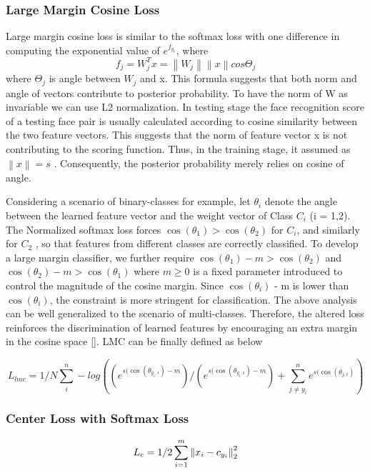 \documentclass[a4paper,12pt, twoside]{NITKReport}
\begin{document}
\subsubsection{Large Margin Cosine Loss}
Large margin cosine loss is similar to the softmax loss with one difference in computing the exponential value of $e^{f_{y_{i}}}$, where 
\begin{equation}
{f_{j}}=W_{j}^{T} x = \left \| W_{j} \right \|\left \| x \right \|cos\Theta _{j}
\end{equation}
where $\Theta _{j}$ is angle between $W_{j}$ and x. This formula suggests that both norm and angle of vectors contribute to posterior probability. To have the norm of W as invariable we can use L2 normalization. In testing stage the face recognition score of a testing face pair is usually calculated according to cosine similarity between the two feature vectors.  This suggests that the norm of feature vector x is not  contributing to the scoring function.  Thus, in the training stage, it assumed as $\left \| x \right \| =s$ . Consequently, the posterior probability merely relies on cosine of angle.

Considering  a  scenario  of  binary-classes  for  example, let $\theta _{i}$ denote the angle between the learned feature vector and  the  weight  vector  of  Class $C_{i}$ (i = 1,2). The Normalized softmax loss forces $\cos(\theta_{1}) > \cos(\theta_{2})$ for $C_{i}$, and similarly  for $C_{2}$ , so that features from different classes are correctly classified. To develop a large margin classifier, we further require $\cos(\theta_{1}) - m > \cos(\theta_{2})$ and $\cos(\theta_{2}) - m > \cos(\theta_{1})$ where $m \geq 0$  is a fixed parameter introduced to control the magnitude of the cosine margin. Since $\cos(\theta_{i})$ - m is lower than $\cos(\theta_{i})$, the constraint is more stringent for classification. The above analysis can be well generalized to the scenario of multi-classes.  Therefore, the altered loss reinforces the
discrimination of learned features by encouraging an extra margin in the cosine space [\cite{DBLP:journals/corr/abs-1801-09414}]. LMC can be finally defined as below

\begin{equation}
L_{lmc} = 1/N\sum_{i}^{n} -log((e^{s(\cos(\theta_{y_{i},i})-m})/
(e^{s(\cos(\theta_{y_{i},i})-m})+\sum_{j\neq y_{i}}^{n} e^{s(\cos(\theta_{j,i})})
\end{equation}


\subsubsection{Center Loss with Softmax Loss}
\begin{equation}
\centering
L_{c} = 1/2 \sum_{i=1}^{m}\left \| x{_{i}} - c_{y_{i}} \right \|_{2}^{2}
\end{equation}
\end{document}
